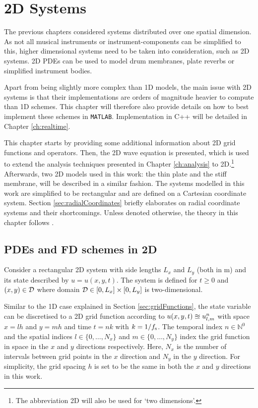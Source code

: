 \chapter{2D Systems}\label{ch:2Dsyst}
The previous chapters considered systems distributed over one spatial dimension. As not all musical instruments or instrument-components can be simplified to this, higher dimensional systems need to be taken into consideration, such as 2D systems. 2D PDEs can be used to model drum membranes, plate reverbs or simplified instrument bodies. 

Apart from being slightly more complex than 1D models, the main issue with 2D systems is that their implementations are orders of magnitude heavier to compute than 1D schemes. This chapter will therefore also provide details on how to best implement these schemes in \texttt{MATLAB}. Implementation in C++ will be detailed in Chapter \ref{ch:realtime}.

This chapter starts by providing some additional information about 2D grid functions and operators. Then, the 2D wave equation is presented, which is used to extend the analysis techniques presented in Chapter \ref{ch:analysis} to 2D.\footnote{The abbreviation 2D will also be used for `two dimensions'.} Afterwards, two 2D models used in this work: the thin plate and the stiff membrane, will be described in a similar fashion.
The systems modelled in this work are simplified to be rectangular and are defined on a Cartesian coordinate system. Section \ref{sec:radialCoordinates} briefly elaborates on radial coordinate systems and their shortcomings. 
Unless denoted otherwise, the theory in this chapter follows \cite{theBible}.

\section{PDEs and FD schemes in 2D}\label{sec:2Dintro}
Consider a rectangular 2D system with side lengths $L_x$ and $L_y$ (both in m) and its state described by $u = u(x,y,t)$. The system is defined for $t\geq 0$ and $(x,y) \in \mathcal{D}$ where domain $\mathcal{D} \in [0, L_x]\times [0, L_y]$ is two-dimensional. 

Similar to the 1D case explained in Section \ref{sec:gridFunctions}, the state variable can be discretised to a 2D grid function according to $u(x, y, t) \approxeq u_{l,m}^n$ with space $x = lh$ and $y = mh$ and time $t = nk$ with $k=1/f_\text{s}$. The temporal index $n\in\mathbb{N}^0$  and the spatial indices $l\in \{0, \hdots, N_x\}$ and $m\in \{0, \hdots, N_y\}$ index the grid function in space in the $x$ and $y$ directions respectively. Here, $N_x$ is the number of intervals between grid points in the $x$ direction and $N_y$ in the $y$ direction. For simplicity, the grid spacing $h$ is set to be the same in both the $x$ and $y$ directions in this work.

